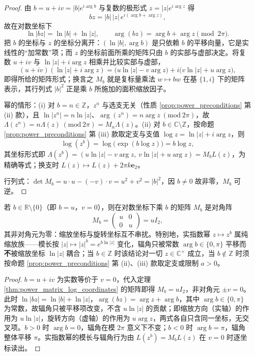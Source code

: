 \begin{proof}
由 $b=u+iv=|b|e^{i\arg b}$ 与复数的极形式 $z=|z|e^{i\arg z}$ 得
\[
bz=|b|\,|z|\,e^{i(\arg b+\arg z)},
\]
故在对数坐标下
\[
\ln|bz|=\ln|b|+\ln|z|,\qquad \arg(bz)=\arg b+\arg z\pmod{2\pi}.
\]
把 $b$ 的坐标与 $z$ 的坐标分离开：$(\ln|b|,\arg b)$ 是只依赖 $b$ 的平移向量，它是实线性的“加常数”项；而 $z$ 的坐标前面所乘的矩阵只由 $b$ 的实部与虚部决定。将复数 $u+iv$ 与 $\ln|z|+i\arg z$ 相乘并比较实部与虚部，
\[
(u+iv)(\ln|z|+i\arg z)=\bigl(u\ln|z|-v\arg z\bigr)+i\bigl(v\ln|z|+u\arg z\bigr),
\]
即得所给的矩阵形式；换言之 $M_b$ 就是复标量乘法 $w\mapsto bw$ 在基 $\{1,i\}$ 下的矩阵表示，其行列式 $|b|^2$ 正是乘 $b$ 所施加的面积缩放因子。

幂的情形：(i) 对 $b=n\in\mathbb{Z}$，$z^n$ 与选支无关（性质 \ref{prop:power_preconditions} 第 (ii) 款），且 $\ln|z^n|=n\ln|z|$、$\arg(z^n)=n\arg z\ (\mathrm{mod}\ 2\pi)$，故 $\Lambda(z^n)=n\Lambda(z)\ (\mathrm{mod}\ 2\pi)=M_n\Lambda(z)$。(ii) 对 $b\in\mathbb{C}\setminus\mathbb{Z}$，按命题 \ref{prop:power_preconditions} 第 (iii) 款取定支与支值 $\log z=\ln|z|+i\arg z$，则
\[
\log(z^b)=\log\bigl(\exp(b\log z)\bigr)=b\log z,
\]
其坐标形式即 $\Lambda(z^b)=(u\ln|z|-v\arg z,\ v\ln|z|+u\arg z)=M_bL(z)$，为精确等式；换支时 $L(z)\mapsto L(z)+2\pi k\mathbf{e}_2$。

行列式：$\det M_b=u\cdot u-(-v)\cdot v=u^2+v^2=|b|^2$，因 $b\neq0$ 故非零，$M_b$ 可逆。
\end{proof}

\begin{lemma}[实指数不产生耦合]\label{lem:real_power_no_coupling}
若 $b\in\mathbb{R}\setminus\{0\}$（即 $b=u$，$v=0$），则在对数坐标下乘 $b$ 的矩阵 $M_b$ 是对角阵
\[
M_b=\begin{pmatrix}u&0\\ 0&u\end{pmatrix}=uI_2,
\]
其非对角元为零：缩放坐标与旋转坐标互不串扰。特别地，实指数幂 $z\mapsto z^b$ 属纯缩放族——模长按 $|z|\mapsto|z|^b=e^{b\ln|z|}$ 变化，辐角只被常数 $\arg b\in\{0,\pi\}$ 平移而\textbf{不}被缩放坐标 $\ln|z|$ 耦合；当 $b\in\mathbb{Z}$ 时该结论对一切 $z\in\mathbb{C}^{\times}$ 成立，当 $b\notin\mathbb{Z}$ 时须按命题 \ref{prop:power_preconditions} 第 (ii)、(iii) 款取定支或限制 $a>0$。
\end{lemma}

\begin{proof}
$b=u+iv$ 为实数等价于 $v=0$，代入定理 \ref{thm:power_matrix_log_coordinates} 的矩阵即得 $M_b=uI_2$，非对角元 $\pm v=0$。此时 $\ln|bz|=\ln|b|+\ln|z|$，$\arg(bz)=\arg z+\arg b$，其中 $\arg b\in\{0,\pi\}$ 为常数，故辐角只被平移项改变，不含 $u\ln|z|$ 的贡献；即缩放方向（实轴）的作用为 $u\ln|z|$，旋转方向（虚轴）的作用为 $u\arg z$，两式各自只含同一坐标，无交叉项。$b>0$ 时 $\arg b=0$，辐角在模 $2\pi$ 意义下不变；$b<0$ 时 $\arg b=\pi$，辐角整体平移 $\pi$。实指数幂的模长与辐角行为由 $L(z^b)=M_bL(z)$ 在 $v=0$ 时逐坐标读出。
\end{proof}

